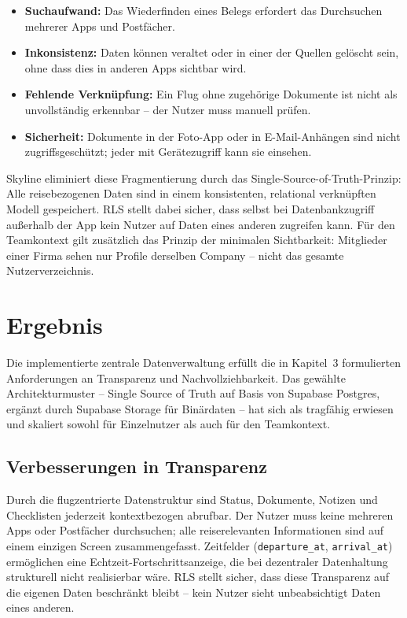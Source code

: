 \begin{itemize}
  \item \textbf{Suchaufwand:} Das Wiederfinden eines Belegs erfordert das Durchsuchen
        mehrerer Apps und Postfächer.
  \item \textbf{Inkonsistenz:} Daten können veraltet oder in einer der Quellen gelöscht
        sein, ohne dass dies in anderen Apps sichtbar wird.
  \item \textbf{Fehlende Verknüpfung:} Ein Flug ohne zugehörige Dokumente ist nicht
        als unvollständig erkennbar -- der Nutzer muss manuell prüfen.
  \item \textbf{Sicherheit:} Dokumente in der Foto-App oder in E-Mail-Anhängen sind
        nicht zugriffsgeschützt; jeder mit Gerätezugriff kann sie einsehen.
\end{itemize}

Skyline eliminiert diese Fragmentierung durch das Single-Source-of-Truth-Prinzip:
Alle reisebezogenen Daten sind in einem konsistenten, relational verknüpften Modell
gespeichert.
RLS stellt dabei sicher, dass selbst bei Datenbankzugriff außerhalb der App
kein Nutzer auf Daten eines anderen zugreifen kann.
Für den Teamkontext gilt zusätzlich das Prinzip der minimalen Sichtbarkeit:
Mitglieder einer Firma sehen nur Profile derselben Company -- nicht das
gesamte Nutzerverzeichnis.

\section{Ergebnis}

Die implementierte zentrale Datenverwaltung erfüllt die in Kapitel~3 formulierten
Anforderungen an Transparenz und Nachvollziehbarkeit.
Das gewählte Architekturmuster -- Single Source of Truth auf Basis von
Supabase Postgres, ergänzt durch Supabase Storage für Binärdaten -- hat sich
als tragfähig erwiesen und skaliert sowohl für Einzelnutzer als auch für
den Teamkontext.

\subsection{Verbesserungen in Transparenz}

Durch die flugzentrierte Datenstruktur sind Status, Dokumente, Notizen und
Checklisten jederzeit kontextbezogen abrufbar.
Der Nutzer muss keine mehreren Apps oder Postfächer durchsuchen; alle
reiserelevanten Informationen sind auf einem einzigen Screen zusammengefasst.
Zeitfelder (\texttt{departure\_at}, \texttt{arrival\_at}) ermöglichen eine
Echtzeit-Fortschrittsanzeige, die bei dezentraler Datenhaltung strukturell
nicht realisierbar wäre.
RLS stellt sicher, dass diese Transparenz auf die eigenen Daten beschränkt
bleibt -- kein Nutzer sieht unbeabsichtigt Daten eines anderen.

